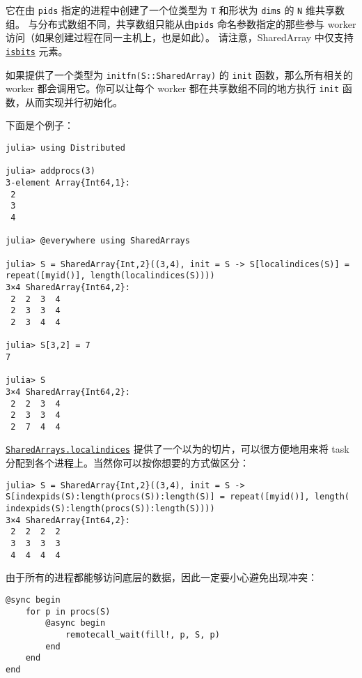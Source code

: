 它在由 \texttt{pids} 指定的进程中创建了一个位类型为 \texttt{T} 和形状为 \texttt{dims} 的 \texttt{N} 维共享数组。 与分布式数组不同，共享数组只能从由\texttt{pids} 命名参数指定的那些参与 worker 访问（如果创建过程在同一主机上，也是如此）。 请注意，SharedArray 中仅支持 \hyperlink{12980593021531333073}{\texttt{isbits}} 元素。



如果提供了一个类型为 \texttt{initfn(S::SharedArray)} 的 \texttt{init} 函数，那么所有相关的 worker 都会调用它。你可以让每个 worker 都在共享数组不同的地方执行 \texttt{init} 函数，从而实现并行初始化。



下面是个例子：




\begin{verbatim}
julia> using Distributed

julia> addprocs(3)
3-element Array{Int64,1}:
 2
 3
 4

julia> @everywhere using SharedArrays

julia> S = SharedArray{Int,2}((3,4), init = S -> S[localindices(S)] = repeat([myid()], length(localindices(S))))
3×4 SharedArray{Int64,2}:
 2  2  3  4
 2  3  3  4
 2  3  4  4

julia> S[3,2] = 7
7

julia> S
3×4 SharedArray{Int64,2}:
 2  2  3  4
 2  3  3  4
 2  7  4  4
\end{verbatim}



\hyperlink{12447667054613272081}{\texttt{SharedArrays.localindices}} 提供了一个以为的切片，可以很方便地用来将 task 分配到各个进程上。当然你可以按你想要的方式做区分：




\begin{verbatim}
julia> S = SharedArray{Int,2}((3,4), init = S -> S[indexpids(S):length(procs(S)):length(S)] = repeat([myid()], length( indexpids(S):length(procs(S)):length(S))))
3×4 SharedArray{Int64,2}:
 2  2  2  2
 3  3  3  3
 4  4  4  4
\end{verbatim}



由于所有的进程都能够访问底层的数据，因此一定要小心避免出现冲突：




\begin{verbatim}
@sync begin
    for p in procs(S)
        @async begin
            remotecall_wait(fill!, p, S, p)
        end
    end
end
\end{verbatim}



